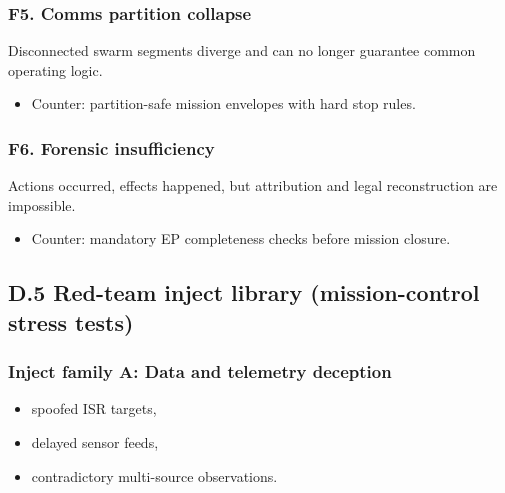 \documentclass[
]{article}
\providecommand{\tightlist}{%
  \setlength{\itemsep}{0pt}\setlength{\parskip}{0pt}}
\begin{document}
\hypertarget{f5.-comms-partition-collapse}{%
\subsubsection{F5. Comms partition
collapse}\label{f5.-comms-partition-collapse}}

Disconnected swarm segments diverge and can no longer guarantee common
operating logic.

\begin{itemize}
\tightlist
\item
  Counter: partition-safe mission envelopes with hard stop rules.
\end{itemize}

\hypertarget{f6.-forensic-insufficiency}{%
\subsubsection{F6. Forensic
insufficiency}\label{f6.-forensic-insufficiency}}

Actions occurred, effects happened, but attribution and legal
reconstruction are impossible.

\begin{itemize}
\tightlist
\item
  Counter: mandatory EP completeness checks before mission closure.
\end{itemize}

\hypertarget{d.5-red-team-inject-library-mission-control-stress-tests}{%
\subsection{D.5 Red-team inject library (mission-control stress
tests)}\label{d.5-red-team-inject-library-mission-control-stress-tests}}

\hypertarget{inject-family-a-data-and-telemetry-deception}{%
\subsubsection{Inject family A: Data and telemetry
deception}\label{inject-family-a-data-and-telemetry-deception}}

\begin{itemize}
\tightlist
\item
  spoofed ISR targets,
\item
  delayed sensor feeds,
\item
  contradictory multi-source observations.
\end{itemize}
\end{document}
